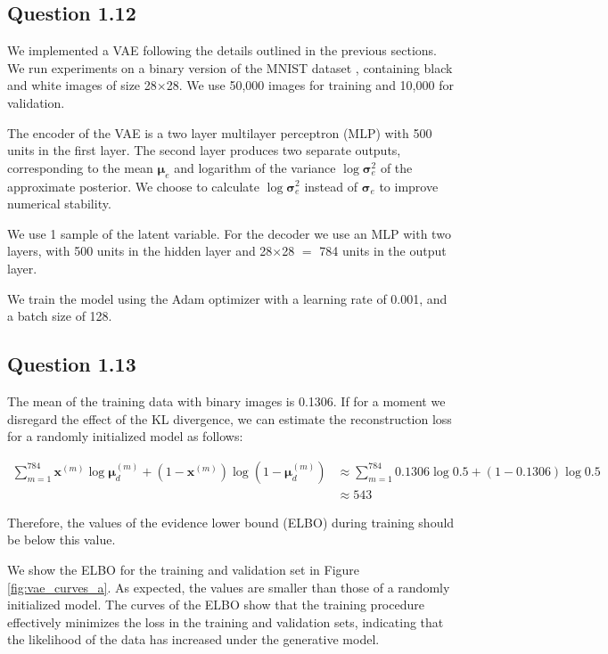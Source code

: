 \documentclass{article}
\begin{document}
\subsection*{Question 1.12}

We implemented a VAE following the details outlined in the previous sections. We run experiments on a binary version of the MNIST dataset \cite{lecun1998gradient}, containing black and white images of size 28$\times$28. We use 50,000 images for training and 10,000 for validation.

The encoder of the VAE is a two layer multilayer perceptron (MLP) with 500 units in the first layer. The second layer produces two separate outputs, corresponding to the mean $\boldsymbol{\mu}_e$ and logarithm of the variance $\log\boldsymbol{\sigma}_e^2$ of the approximate posterior. We choose to calculate $\log\boldsymbol{\sigma}_e^2$ instead of $\boldsymbol{\sigma}_e$ to improve numerical stability.

We use 1 sample of the latent variable. For the decoder we use an MLP with two layers, with 500 units in the hidden layer and 28$\times$28 $=$ 784 units in the output layer.

We train the model using the Adam optimizer \cite{kingma2014adam} with a learning rate of 0.001, and a batch size of 128.

\subsection*{Question 1.13}

The mean of the training data with binary images is 0.1306. If for a moment we disregard the effect of the KL divergence, we can estimate the reconstruction loss for a randomly initialized model as follows:

\begin{align*}
\sum_{m=1}^{784} \mathbf{x}^{(m)}\log\boldsymbol{\mu}_d^{(m)} + (1-\mathbf{x}^{(m)})\log(1 -\boldsymbol{\mu}_d^{(m)})
&\approx
\sum_{m=1}^{784} 0.1306\log 0.5 + (1-0.1306)\log 0.5 \\
&\approx 543
\end{align*}

Therefore, the values of the evidence lower bound (ELBO) during training should be below this value.

We show the ELBO for the training and validation set in Figure \ref{fig:vae_curves_a}. As expected, the values are smaller than those of a randomly initialized model. The curves of the ELBO show that the training procedure effectively minimizes the loss in the training and validation sets, indicating that the likelihood of the data has increased under the generative model.
\end{document}
